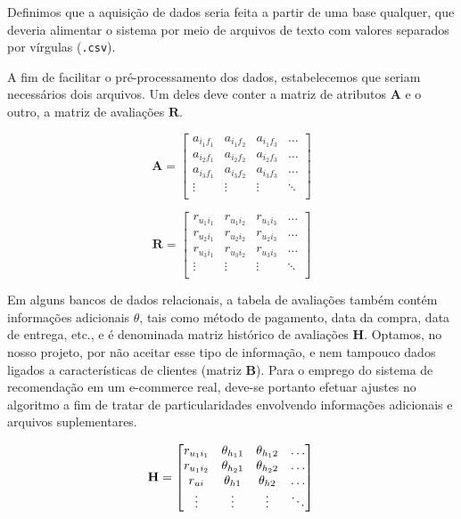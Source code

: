Definimos que a aquisição de dados seria feita a partir de uma base qualquer, que deveria alimentar o sistema por meio de arquivos de texto com valores separados por vírgulas (\texttt{.csv}).

A fim de facilitar o pré-processamento dos dados, estabelecemos que seriam necessários dois arquivos. Um deles deve conter a matriz de atributos $\mathbf{A}$ e o outro, a matriz de avaliações  $\mathbf{R}$. 

\begin{equation} 
\mathbf{A} = 
\begin{bmatrix} 
 a_{i_1 f_1} &  a_{i_1 f_2} &  a_{i_1 f_3}  & \dots   \\
 a_{i_2 f_1} &  a_{i_2 f_2} &  a_{i_2 f_3}  & \dots   \\
 a_{i_3 f_1} &  a_{i_3 f_2} &  a_{i_3 f_3}  & \dots  \\ 
 \vdots &  \vdots &  \vdots  & \ddots   \\
 \end{bmatrix}
\end{equation}


\begin{equation}
	  \mathbf{R} = 
\begin{bmatrix} 
  r_{u_1 i_1} &  r_{u_1 i_2} &  r_{u_1 i_3}  & \dots   \\
 r_{u_2 i_1} &  r_{u_2 i_2} &  r_{u_2 i_3}  & \dots   \\
 r_{u_3 i_1} &  r_{u_3 i_2} &  r_{u_3 i_3}  & \dots  \\ 
 \vdots &  \vdots &  \vdots  & \ddots   \\
\end{bmatrix}
\end{equation}

Em alguns bancos de dados relacionais, a tabela de avaliações também contém informações adicionais $\theta$, tais como método de pagamento, data da compra, data de entrega, etc., e é denominada matriz histórico de avaliações $\mathbf{H}$. Optamos, no nosso projeto, por não aceitar esse tipo de informação, e nem tampouco dados ligados a características de clientes (matriz $\mathbf{B}$). Para o emprego do sistema de recomendação em um e-commerce real, deve-se portanto efetuar ajustes no algoritmo a fim de tratar de particularidades envolvendo informações adicionais e arquivos suplementares.

\begin{equation} 
\mathbf{H} =
\begin{bmatrix} 
 r_{u_1 i_1} &  \theta_{h_1 1} &  \theta_{h_1 2} & \dots   \\
 r_{u_1 i_2} &  \theta_{h_2 1} &  \theta_{h_2 2} & \dots   \\
 r_{u i} &  \theta_{h 1} &  \theta_{h 2} & \dots   \\
 \vdots &  \vdots &  \vdots  & \ddots   \\
 \end{bmatrix} \\
\end{equation}

